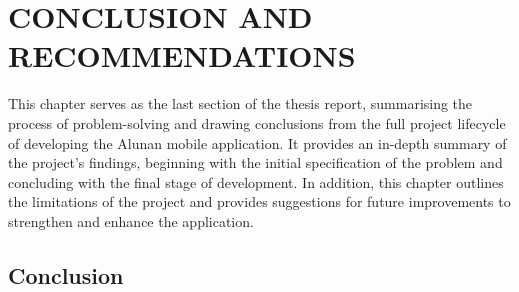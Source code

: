 \chapter{CONCLUSION AND RECOMMENDATIONS}
\label{ch:conclusion}
This chapter serves as the last section of the thesis report, summarising the process of problem-solving and drawing conclusions from the full project lifecycle of developing the Alunan mobile application. It provides an in-depth summary of the project's findings, beginning with the initial specification of the problem and concluding with the final stage of development. In addition, this chapter outlines the limitations of the project and provides suggestions for future improvements to strengthen and enhance the application.

\section{Conclusion}
